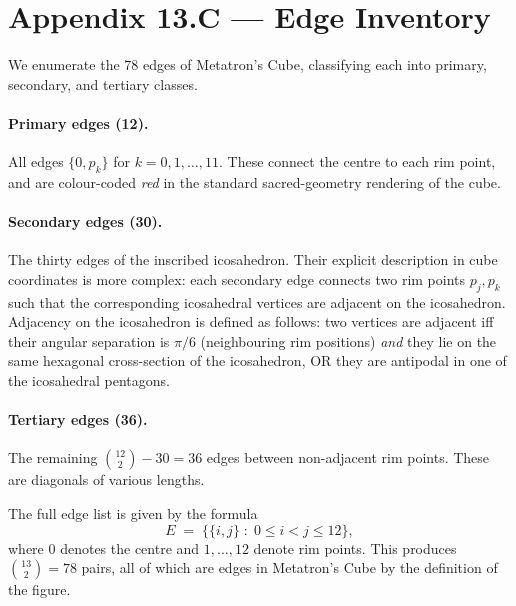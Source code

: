 \section*{Appendix 13.C --- Edge Inventory}
\label{sec:13-appC}

We enumerate the $78$ edges of Metatron's Cube, classifying each
into primary, secondary, and tertiary classes.

\paragraph{Primary edges (12).}
All edges $\{0, p_{k}\}$ for $k = 0, 1, \ldots, 11$. These connect
the centre to each rim point, and are colour-coded \emph{red} in
the standard sacred-geometry rendering of the cube.

\paragraph{Secondary edges (30).}
The thirty edges of the inscribed icosahedron. Their explicit
description in cube coordinates is more complex: each secondary
edge connects two rim points $p_{j}, p_{k}$ such that the
corresponding icosahedral vertices are adjacent on the
icosahedron. Adjacency on the icosahedron is defined as follows:
two vertices are adjacent iff their angular separation is $\pi/6$
(neighbouring rim positions) \emph{and} they lie on the same
hexagonal cross-section of the icosahedron, OR they are antipodal
in one of the icosahedral pentagons.

\paragraph{Tertiary edges (36).}
The remaining $\binom{12}{2} - 30 = 36$ edges between non-adjacent
rim points. These are diagonals of various lengths.

The full edge list is given by the formula
\[
  E \;=\; \bigl\{ \{i, j\} \;:\; 0 \leq i < j \leq 12 \bigr\},
\]
where $0$ denotes the centre and $1, \ldots, 12$ denote rim points.
This produces $\binom{13}{2} = 78$ pairs, all of which are edges in
Metatron's Cube by the definition of the figure.

